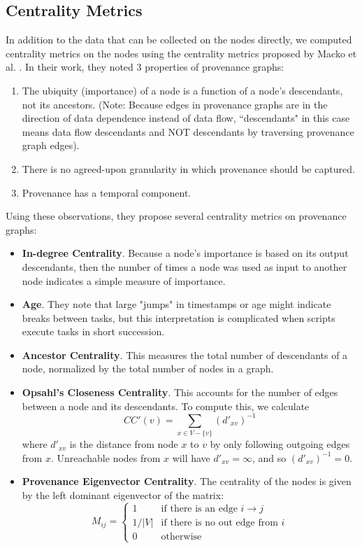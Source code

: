\documentclass[10pt,twocolumn]{article}
\begin{document}
\subsection{Centrality Metrics}
In addition to the data that can be collected on the nodes directly, we computed centrality metrics on the nodes using the centrality metrics proposed by Macko et al. \cite{clustering}. In their work, they noted 3 properties of provenance graphs:
\begin{enumerate}
\item The ubiquity (importance) of a node is a function of a node's descendants, not its ancestors. (Note: Because edges in provenance graphs are in the direction of data dependence instead of data flow, ``descendants" in this case means data flow descendants and NOT descendants by traversing provenance graph edges).
\item There is no agreed-upon granularity in which provenance should be captured.
\item Provenance has a temporal component.
\end{enumerate}

Using these observations, they propose several centrality metrics on provenance graphs:
\begin{itemize}
\item \textbf{In-degree Centrality}. Because a node's importance is based on its output descendants, then the number of times a node was used as input to another node indicates a simple measure of importance.
\item \textbf{Age}. They note that large "jumps" in timestamps or age might indicate breaks between tasks, but this interpretation is complicated when scripts execute tasks in short succession.
\item \textbf{Ancestor Centrality}. This measures the total number of descendants of a node, normalized by the total number of nodes in a graph.
\item \textbf{Opsahl's Closeness Centrality}. This accounts for the number of edges between a node and its descendants. To compute this, we calculate
$$CC'(v) = \sum_{x \in V -  \{v\}} (d'_{xv})^{-1}$$
where $d'_{xv}$ is the distance from node $x$ to $v$ by only following outgoing edges from $x$. Unreachable nodes from $x$ will have $d'_{xv} = \infty$, and so $(d'_{xv})^{-1} = 0$.
\item \textbf{Provenance Eigenvector Centrality}. The centrality of the nodes is given by the left dominant eigenvector of the matrix:
$$M_{ij} =
\begin{cases}
1 & \text{if there is an edge } i \to j \\
1/|V| & \text{if there is no out edge from } i \\
0 & \text{otherwise}
\end{cases}
$$
\end{itemize}
\end{document}
